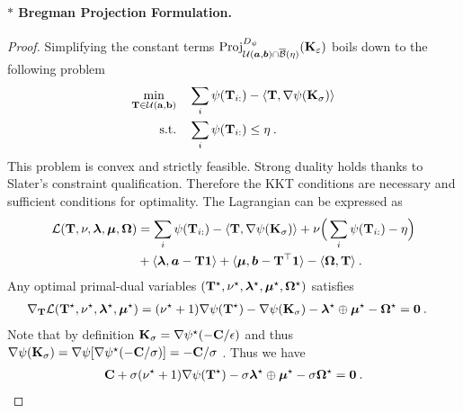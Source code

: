 \paragraph{$\ast$ Bregman Projection Formulation.}

\begin{proof}    
    Simplifying the constant terms $\operatorname{Proj}^{D_\psi}_{{\mathcal{U}}(\bm{a}, \bm{b}) \cap \overline{\mathcal{B}}(\eta)}({\mathbf{K}}_\varepsilon)$ boils down to the following problem
    \begin{align}
        \min_{{\mathbf{T}} \in {\mathcal{U}}({\mathbf{a}}, {\mathbf{b}})} \quad &\sum_i \psi({\mathbf{T}}_{i:}) - \langle {\mathbf{T}}, \nabla \psi({\mathbf{K}}_\sigma) \rangle \\
        \text{s.t.} \quad &\sum_i \psi({\mathbf{T}}_{i:}) \leq \eta \:.
    \end{align}
    This problem is convex and strictly feasible. Strong duality holds thanks to Slater's constraint qualification. Therefore the KKT conditions \citep{boyd2004convex} are necessary and sufficient conditions for optimality.
    The Lagrangian can be expressed as
    \begin{align}
        \mathcal{L}({\mathbf{T}}, \nu, \bm{\lambda}, \bm{\mu}, \mathbf{\Omega}) &= \sum_i \psi({\mathbf{T}}_{i:}) - \langle {\mathbf{T}}, \nabla \psi({\mathbf{K}}_\sigma) \rangle + \nu\Big(\sum_i \psi({\mathbf{T}}_{i:}) - \eta \Big) \\
        &+ \langle \bm{\lambda}, \bm{a} - {\mathbf{T}} \bm{1} \rangle + \langle \bm{\mu}, \bm{b} - {\mathbf{T}}^\top \bm{1} \rangle - \langle \mathbf{\Omega}, {\mathbf{T}} \rangle \:.
    \end{align}
    Any optimal primal-dual variables $({\mathbf{T}}^\star, \nu^\star, \bm{\lambda}^\star, \bm{\mu}^\star, \mathbf{\Omega}^\star)$ satisfies
    \begin{align}
            \nabla_{{\mathbf{T}}} \mathcal{L}({\mathbf{T}}^\star,  \nu^\star, \bm{\lambda}^\star, \bm{\mu}^\star) &=  (\nu^\star + 1) \nabla \psi({\mathbf{T}}^\star) - \nabla \psi({\mathbf{K}}_\sigma) - \bm{\lambda}^\star \oplus \bm{\mu}^\star - \mathbf{\Omega}^\star = \bm{0} \:.
    \end{align}
    Note that by definition ${\mathbf{K}}_\sigma = \nabla \psi^\star(-{\mathbf{C}}/\epsilon)$ and thus $\nabla \psi({\mathbf{K}}_\sigma) = \nabla \psi[\nabla \psi^\star(-{\mathbf{C}}/\sigma)] = -{\mathbf{C}} / \sigma$ \citep{rockafellar1997convex}. Thus we have 
    \begin{align}
        \mC + \sigma (\nu^\star + 1) \nabla \psi(\mT^\star) -  \sigma \bm{\lambda}^\star \oplus \bm{\mu}^\star - \sigma \mathbf{\Omega}^\star= \bm{0} \:.

\end{align}
\end{proof}
